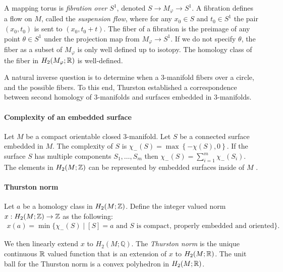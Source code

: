 A mapping torus is \emph{fibration over $S^1$}, denoted $S\rightarrow M_\varphi\rightarrow S^1$.
A fibration defines a flow on $M$, called the \emph{suspension flow}, where for any $x_0\in S$ and $t_0\in S^1$ the pair $(x_0,t_0)$ is sent to $(x_0,t_0+t)$.
The fiber of a fibration is the preimage of any point $\theta \in S^1$ under the projection map from $M_{\varphi} \to S^1$.
If we do not specify $\theta$, the fiber as a subset of $M_\varphi$ is only well defined up to isotopy.   The homology class of the fiber in $H_2(M_{\varphi}; \mathbb{R})$ is well-defined.

A natural inverse question is to determine when a 3-manifold fibers over a circle, and the possible fibers.  To this end, Thurston established a correspondence between second homology of 3-manifolds and surfaces embedded in 3-manifolds.

\paragraph{Complexity of an embedded surface} Let $M$ be a compact orientable closed $3$-manifold.
Let $S$ be a connected surface embedded in $M$.  The complexity of $S$ is $\chi_-(S) = \max\left\{-\chi(S),0\right\}$.
If the surface $S$ has multiple components $S_1, \ldots, S_m$ then $\chi_-(S) = \displaystyle\sum_{i=1}^m\chi_-(S_i)$.
The elements in $H_2(M ; \mathbb{Z})$ can be represented by embedded surfaces inside of $M$ \cite[Lemma 1]{thurston1986norm}.


\paragraph{Thurston norm} Let $a$ be a homology class in $H_2(M; \mathbb{Z})$.  Define the integer valued norm $x:H_2(M;\mathbb{Z})\rightarrow \mathbb{Z}$ as the following:
\begin{align*}
  x(a) = \min\{\chi_-(S) \mid [S] = a \text{ and $S$ is compact, properly embedded and oriented}\}.
\end{align*}

We then linearly extend $x$ to $H_2(M;\mathbb{Q})$.  The \emph{Thurston norm} is the unique continuous $\mathbb{R}$ valued function that is an extension of $x$ to $H_2(M;\mathbb{R})$.
The unit ball for the Thurston norm is a convex polyhedron in $H_2(M;\mathbb{R})$.

